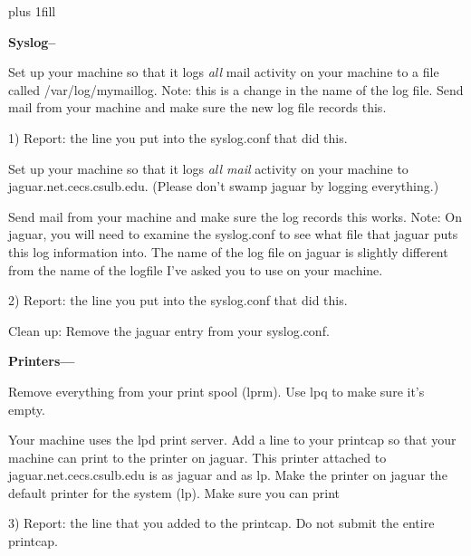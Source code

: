 
\rightskip=0pt plus 1fill

\parindent 0pt

{\bf Syslog--}

Set up your machine so that it logs {\it  all} mail activity 
on your machine to a file called {\ltt{}/var/log/mymaillog}.
Note: this is a change in the name of the log file.
Send mail from your machine and make sure the new log file records this.

1) Report: the line you put into the syslog.conf that did this.

Set up your machine so that it logs {\it all mail} activity 
on your machine to 
{\ltt{}jaguar.net.cecs.csulb.edu}.
(Please don't swamp jaguar by logging everything.)

Send mail from your machine and make sure the log records this works.
Note: On {\ltt{}jaguar}, you will need to examine the {\ltt{}syslog.conf}
to see what file that {\ltt{}jaguar} puts this log information into.
The name of the log file on jaguar is slightly different from
the name of the logfile I've asked you to use on your machine.

2) Report: the line you put into the syslog.conf that did this.

Clean up: Remove the {\ltt{}jaguar} entry from your {\ltt{}syslog.conf}.

{\bf Printers---}

Remove everything from your print spool ({\ltt{}lprm}).
Use {\ltt{}lpq} to make sure it's empty.

Your machine uses the lpd print server.
Add a line to your printcap so that your machine can
print to the printer on jaguar.
This printer attached to {\ltt{}jaguar.net.cecs.csulb.edu} is
as {\ltt{}jaguar} and as {\ltt{}lp}.
Make the printer on {\ltt{}jaguar} the default printer for the system 
({\ltt{}lp}).
Make sure you can print

3) Report: the line that you added to the printcap. 
Do not submit the entire printcap.



\bye
